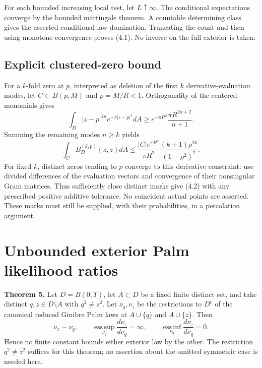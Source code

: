 \documentclass[11pt,a4paper]{article}
\theoremstyle{definition}
\theoremstyle{remark}
\numberwithin{equation}{section}
\begin{document}
For each bounded increasing local test, let \(L\uparrow\infty\). The conditional expectations converge by the bounded martingale theorem. A countable determining class gives the asserted conditional-law domination. Truncating the count and then using monotone convergence proves (4.1). No inverse on the full exterior is taken.

\hypertarget{explicit-clustered-zero-bound}{%
\subsection{Explicit clustered-zero bound}\label{explicit-clustered-zero-bound}}

For a \(k\)-fold zero at \(p\), interpreted as deletion of the first \(k\) derivative-evaluation modes, let \(C\subset B(p,M)\) and \(\rho=M/R<1\). Orthogonality of the centered monomials gives \[
\int_D|z-p|^{2n}e^{-\pi|z-p|^2}dA
\ge e^{-\pi R^2}\frac{\pi R^{2n+2}}{n+1}.
\] Summing the remaining modes \(n\ge k\) yields \[
\boxed{\quad
\int_C B_D^{(k,p)}(z,z)dA
\le
\frac{|C|e^{\pi R^2}}{\pi R^2}
\frac{(k+1)\rho^{2k}}{(1-\rho^2)^2}.
\quad}
\tag{4.2}
\] For fixed \(k\), distinct zeros tending to \(p\) converge to this derivative constraint: use divided differences of the evaluation vectors and convergence of their nonsingular Gram matrices. Thus sufficiently close distinct marks give (4.2) with any prescribed positive additive tolerance. No coincident actual points are asserted. These marks must still be supplied, with their probabilities, in a percolation argument.

\hypertarget{unbounded-exterior-palm-likelihood-ratios}{%
\section{Unbounded exterior Palm likelihood ratios}\label{unbounded-exterior-palm-likelihood-ratios}}

\textbf{Theorem 5.} Let \(D=B(0,T)\), let \(A\subset D\) be a fixed finite distinct set, and take distinct \(q,z\in D\setminus A\) with \(q^2\ne z^2\). Let \(\nu_q,\nu_z\) be the restrictions to \(D^c\) of the canonical reduced Ginibre Palm laws at \(A\cup\{q\}\) and \(A\cup\{z\}\). Then \[
\nu_z\sim\nu_q,\qquad
\operatorname*{ess\,sup}_{\nu_q}\frac{d\nu_z}{d\nu_q}=\infty,
\qquad
\operatorname*{ess\,inf}_{\nu_q}\frac{d\nu_z}{d\nu_q}=0.
\tag{5.1}
\] Hence no finite constant bounds either exterior law by the other. The restriction \(q^2\ne z^2\) suffices for this theorem; no assertion about the omitted symmetric case is needed here.
\end{document}
